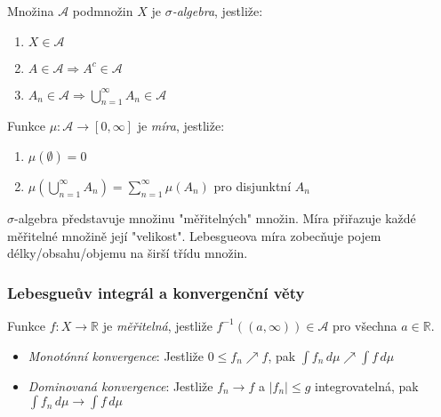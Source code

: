 \begin{definition}
Množina $\mathcal{A}$ podmnožin $X$ je \emph{$\sigma$-algebra}, jestliže:
\begin{enumerate}
\item $X \in \mathcal{A}$
\item $A \in \mathcal{A} \Rightarrow A^c \in \mathcal{A}$
\item $A_n \in \mathcal{A} \Rightarrow \bigcup_{n=1}^\infty A_n \in \mathcal{A}$
\end{enumerate}
\end{definition}

\begin{definition}[Míra]
Funkce $\mu: \mathcal{A} \to [0,\infty]$ je \emph{míra}, jestliže:
\begin{enumerate}
\item $\mu(\emptyset) = 0$
\item $\mu\left(\bigcup_{n=1}^\infty A_n\right) = \sum_{n=1}^\infty \mu(A_n)$ pro disjunktní $A_n$
\end{enumerate}
\end{definition}

\begin{intuition}
$\sigma$-algebra představuje množinu "měřitelných" množin. Míra přiřazuje každé měřitelné množině její "velikost". Lebesgueova míra zobecňuje pojem délky/obsahu/objemu na širší třídu množin.
\end{intuition}

\subsubsection{Lebesgueův integrál a konvergenční věty}

\begin{definition}
Funkce $f: X \to \mathbb{R}$ je \emph{měřitelná}, jestliže $f^{-1}((a,\infty)) \in \mathcal{A}$ pro všechna $a \in \mathbb{R}$.
\end{definition}

\begin{theorem}
\begin{itemize}
\item \emph{Monotónní konvergence}: Jestliže $0 \leq f_n \nearrow f$, pak $\int f_n \, d\mu \nearrow \int f \, d\mu$
\item \emph{Dominovaná konvergence}: Jestliže $f_n \to f$ a $|f_n| \leq g$ integrovatelná, pak $\int f_n \, d\mu \to \int f \, d\mu$
\end{itemize}
\end{theorem}

